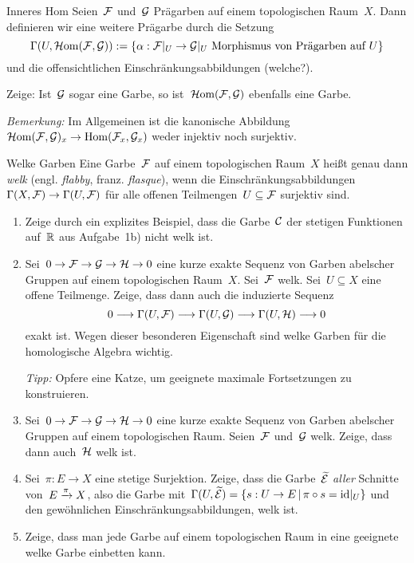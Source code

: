\documentclass{uebblatt}
\begin{document}
\begin{aufgabe}{Inneres Hom}
Seien~$\mathcal{F}$ und~$\mathcal{G}$ Prägarben auf einem topologischen Raum~$X$. Dann
definieren wir eine weitere Prägarbe durch die Setzung
\[ \Gamma(U, \mathcal{H}\mathrm{om}(\mathcal{F},\mathcal{G})) := \{ \alpha : \mathcal{F}|_U \to \mathcal{G}|_U \text{ Morphismus von Prägarben auf~$U$} \} \]
und die offensichtlichen Einschränkungsabbildungen (welche?).

Zeige: Ist~$\mathcal{G}$ sogar eine Garbe, so ist~$\mathcal{H}\mathrm{om}(\mathcal{F},\mathcal{G})$ ebenfalls eine Garbe.

\emph{Bemerkung:} Im Allgemeinen ist die kanonische
Abbildung~$\mathcal{H}\mathrm{om}(\mathcal{F},\mathcal{G})_x \to \mathrm{Hom}(\mathcal{F}_x,\mathcal{G}_x)$ weder injektiv noch surjektiv.
\end{aufgabe}

\newpage

\begin{aufgabe}{Welke Garben}
Eine Garbe~$\mathcal{F}$ auf einem topologischen Raum~$X$ heißt genau dann \emph{welk}
(engl. \emph{flabby}, franz. \emph{flasque}),
wenn die Einschränkungsabbildungen~$\Gamma(X,\mathcal{F}) \to \Gamma(U,\mathcal{F})$ für alle
offenen Teilmengen~$U \subseteq \mathcal{F}$ surjektiv sind.

\begin{enumerate}
\item Zeige durch ein explizites Beispiel, dass die Garbe~$\mathcal{C}$ der stetigen
Funktionen auf~$\mathbb{R}$ aus Aufgabe~1b) nicht welk ist.
\item Sei~$0 \to \mathcal{F} \to \mathcal{G} \to \mathcal{H} \to 0$ eine kurze exakte Sequenz von Garben
abelscher Gruppen auf einem topologischen Raum~$X$. Sei~$\mathcal{F}$ welk. Sei~$U
\subseteq X$ eine offene Teilmenge. Zeige, dass
dann auch die induzierte Sequenz
\[ 0 \longrightarrow \Gamma(U,\mathcal{F}) \longrightarrow \Gamma(U,\mathcal{G}) \longrightarrow \Gamma(U,\mathcal{H}) \longrightarrow 0 \]
exakt ist. Wegen dieser besonderen Eigenschaft sind welke Garben für die
homologische Algebra wichtig.

\emph{Tipp:} Opfere eine Katze, um geeignete maximale Fortsetzungen
zu konstruieren.
\item Sei~$0 \to \mathcal{F} \to \mathcal{G} \to \mathcal{H} \to 0$ eine kurze exakte Sequenz von Garben
abelscher Gruppen auf einem topologischen Raum. Seien~$\mathcal{F}$ und~$\mathcal{G}$ welk.
Zeige, dass dann auch~$\mathcal{H}$ welk ist.
\item Sei~$\pi : E \to X$ eine stetige Surjektion. Zeige, dass die
Garbe~$\widetilde{\mathcal{E}}$ \emph{aller} Schnitte von~$E \xrightarrow{\pi} X$, also die Garbe
mit~$\Gamma(U,\widetilde{\mathcal{E}}) = \{ s : U \to E \,|\, \pi
\circ s = \mathrm{id}|_U \}$ und den gewöhnlichen Einschränkungsabbildungen, welk ist.
\item Zeige, dass man jede Garbe auf einem topologischen Raum in eine geeignete
welke Garbe einbetten kann.
\end{enumerate}
\end{aufgabe}
\end{document}
